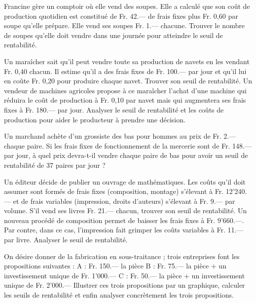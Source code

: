 \begin{exercice}
Francine gère un comptoir où elle vend des soupes. Elle a calculé que son coût de production quotidien est constitué de Fr. 42.— de frais fixes plus Fr. 0,60 par soupe qu’elle prépare. Elle vend ses soupes Fr. 1.— chacune. Trouver le nombre de soupes qu’elle doit vendre dans une journée pour atteindre le seuil de rentabilité.
\end{exercice}

\begin{exercice}
Un maraîcher sait qu’il peut vendre toute sa production de navets en les vendant Fr. 0,40 chacun. Il estime qu’il a des frais fixes de Fr. 100.— par jour et qu’il lui en coûte Fr. 0,20 pour produire chaque navet. Trouver son seuil de rentabilité.
Un vendeur de machines agricoles propose à ce maraîcher l’achat d’une machine qui réduira le coût de production à Fr. 0,10 par navet mais qui augmentera ses frais fixes à Fr. 180.— par jour. Analyser le seuil de rentabilité et les coûts de production pour aider le producteur à prendre une décision.
\end{exercice}

\begin{exercice}
Un marchand achète d’un grossiste des bas pour hommes au prix de Fr. 2.— chaque paire. Si les frais fixes de fonctionnement de la mercerie sont de Fr. 148.— par jour, à quel prix devra-t-il vendre chaque paire de bas pour avoir un seuil de rentabilité de 37 paires par jour ?
\end{exercice}

\begin{exercice}
Un éditeur décide de publier un ouvrage de mathématiques. Les coûts qu’il doit assumer sont formés de frais fixes (composition, montage) s’élevant à Fr. 12'240.— et de frais variables (impression, droits d’auteurs) s’élevant à Fr. 9.— par volume. S’il vend ses livres Fr. 21.— chacun, trouver son seuil de rentabilité.
Un nouveau procédé de composition permet de baisser les frais fixes à Fr. 9'660.—. Par contre, dans ce cas, l’impression fait grimper les coûts variables à Fr. 11.— par livre. Analyser le seuil de rentabilité.
\end{exercice}

\begin{exercice}
On désire donner de la fabrication en sous-traitance ; trois entreprises font les propositions suivantes :
A : Fr. 150.— la pièce
B : Fr.   75.— la pièce + un investissement unique de Fr. 1'000.—
C : Fr.   50.— la pièce + un investissement unique de Fr. 2'000.—
Illustrer ces trois propositions par un graphique, calculer les seuils de rentabilité et enfin analyser concrètement les trois propositions.
\end{exercice}

